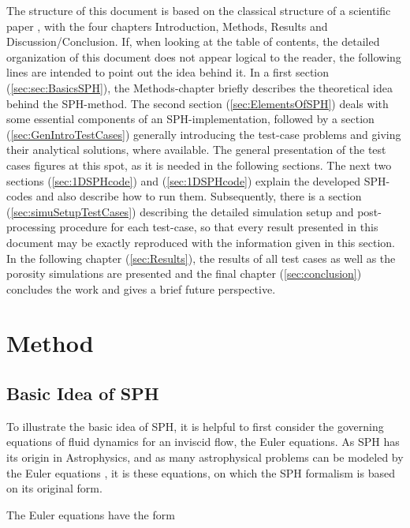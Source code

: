 \documentclass{report}
\begin{document}
The structure of this document is based on the classical structure of a scientific paper \cite{Day2006}, with the four chapters Introduction, Methods, Results and Discussion/Conclusion. If, when looking at the table of contents, the detailed organization of this document does not appear logical to the reader, the following lines are intended to point out the idea behind it.
In a first section (\ref{sec:sec:BasicsSPH}), the Methods-chapter briefly describes the theoretical idea behind the SPH-method. The second section (\ref{sec:ElementsOfSPH}) deals with some essential components of an SPH-implementation, followed by a section (\ref{sec:GenIntroTestCases}) generally introducing the test-case problems and giving their analytical solutions, where available. The general presentation of the test cases figures at this spot, as it is needed in the following sections. The next two sections (\ref{sec:1DSPHcode}) and (\ref{sec:1DSPHcode}) explain the developed SPH-codes and also describe how to run them. Subsequently, there is a section (\ref{sec:simuSetupTestCases}) describing the detailed simulation setup and post-processing procedure for each test-case, so that every result presented in this document may be exactly reproduced with the information given in this section.
In the following chapter (\ref{sec:Results}), the results of all test cases as well as the porosity simulations are presented and the final chapter (\ref{sec:conclusion}) concludes the work and gives a brief future perspective.

\chapter{Method}
\label{sec:method}
\section{Basic Idea of SPH}
\label{sec:BasicsSPH}

To illustrate the basic idea of SPH, it is helpful to first consider the
governing equations of fluid dynamics for an inviscid flow, the Euler equations.  As SPH has its origin in Astrophysics, and as many astrophysical problems can be modeled by the Euler equations \cite{Liu2003}, it is these equations, on which the SPH formalism is based on its original form. 


The Euler equations have the form~\cite{Monaghan2005}
\end{document}
